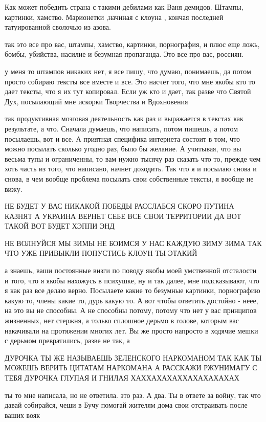 
Как может победить страна с такими дебилами как Ваня демидов. Штампы, картинки,
хамство. Марионетки ,начиная с клоуна , кончая последней татуированной сволочью
из азова.

так это все про вас, штампы, хамство, картинки, порнография, и плюс еще ложь,
бомбы, убийства, насилие и безумная пропаганда. Это все про вас, россиян.

у меня то штампов никаких нет, я все пишу, что думаю, понимаешь, да потом
просто собираю тексты все вместе и все. Это насчет того, что мне якобы кто то
дает тексты, что я их тут копировал. Если уж кто и дает, так разве что Святой
Дух, посылающий мне искорки Творчества и Вдохновения

так продуктивная мозговая деятельность как раз и выражается в текстах как
результате, а что. Сначала думаешь, что написать, потом пишешь, а потом
посылаешь, вот и все. А приятная специфика интернета состоит в том, что можно
посылать сколько угодно раз, было бы желание. А учитывая, что вы весьма тупы и
ограниченны, то вам нужно тысячу раз сказать что то, прежде чем хоть часть из
того, что написано, начнет доходить. Так что я и посылаю снова и снова, в чем
вообще проблема посылать свои собственные тексты, я вообще не вижу.

НЕ БУДЕТ У ВАС НИКАКОЙ ПОБЕДЫ РАССЛАБСЯ СКОРО ПУТИНА КАЗНЯТ А УКРАИНА ВЕРНЕТ
СЕБЕ ВСЕ СВОИ ТЕРРИТОРИИ ДА ВОТ ТАКОЙ ВОТ БУДЕТ ХЭППИ ЭНД

НЕ ВОЛНУЙСЯ МЫ ЗИМЫ НЕ БОИМСЯ У НАС КАЖДУЮ ЗИМУ ЗИМА ТАК ЧТО УЖЕ ПРИВЫКЛИ
ПОПУСТИСЬ КЛОУН ТЫ ЭТАКИЙ

а знаешь, ваши постоянные визги по поводу якобы моей умственной отсталости и
того, что я якобы нахожусь в психушке, ну и так далее, мне подсказывают, что я
как раз все делаю верно. Посылаете какие то безумные картинки, порнографию
какую то, члены какие то, дурь какую то. А вот чтобы ответить достойно - неее,
на это вы не способны. А не способны потому, потому что нет у вас принципов
жизненных, нет стержня, а только сплошное дерьмо в голове, которым вас
накачивали на протяжении многих лет. Вы же просто напросто в ходячие мешки с
дерьмом превратились, разве не так, а

ДУРОЧКА ТЫ ЖЕ НАЗЫВАЕШЬ ЗЕЛЕНСКОГО НАРКОМАНОМ ТАК КАК ТЫ МОЖЕШЬ ВЕРИТЬ ЦИТАТАМ
НАРКОМАНА А РАССКАЖИ РЖУНИМАГУ С ТЕБЯ ДУРОЧКА ГЛУПАЯ И ГНИЛАЯ
ХАХХАХАХАХХАХАХАХАХАХ


ты то мне написала, но не ответила. это раз. А два. Ты в ответе за войну, так
что давай собирайся, чеши в Бучу помогай жителям дома свои отстраивать после
ваших вояк


